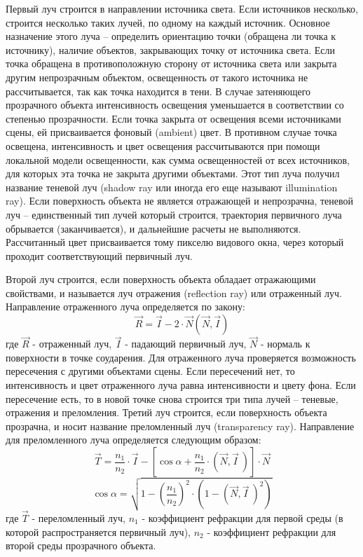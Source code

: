 \documentclass[12pt, a4paper, utf8]{article}
\begin{document}
Первый луч строится в направлении источника света. Если источников несколько, строится несколько таких лучей, по одному на каждый источник. Основное назначение этого луча – определить ориентацию точки (обращена ли точка к источнику), наличие объектов, закрывающих точку от источника света. Если точка обращена в противоположную сторону от источника света или закрыта другим непрозрачным объектом, освещенность от такого источника не рассчитывается, так как точка находится в тени. В случае затеняющего прозрачного объекта интенсивность освещения уменьшается в соответствии со степенью прозрачности. Если точка закрыта от освещения всеми источниками сцены, ей присваивается фоновый (ambient) цвет. В противном случае точка освещена, интенсивность и цвет освещения рассчитываются при помощи локальной модели освещенности, как сумма освещенностей от всех источников, для которых эта точка не закрыта другими объектами. Этот тип луча получил название теневой луч (shadow ray или иногда его еще называют illumination ray). Если поверхность объекта не является отражающей и непрозрачна, теневой луч – единственный тип лучей который строится, траектория первичного луча обрывается (заканчивается), и дальнейшие расчеты не выполняются. Рассчитанный цвет присваивается тому пикселю видового окна, через который проходит соответствующий первичный луч.\par
   Второй луч строится, если поверхность объекта обладает отражающими свойствами, и называется луч отражения (reflection ray) или отраженный луч. Направление отраженного луча определяется по закону:
\begin{equation}
\vec{R} = \vec{I} - 2 \cdot \vec{N} (\vec{N} , \vec{I})
\label{eq_reflect}
\end{equation}
где $\vec{R}$ - отраженный луч, $\vec{I}$ - падающий первичный луч, $\vec{N}$ - нормаль к поверхности в точке соударения.
Для отраженного луча проверяется возможность пересечения с другими объектами сцены. Если пересечений нет, то интенсивность и цвет отраженного луча равна интенсивности и цвету фона. Если пересечение есть, то в новой точке снова строится три типа лучей – теневые, отражения и преломления.
Третий луч строится, если поверхность объекта прозрачна, и носит название преломленный луч (transparency ray). Направление для преломленного луча определяется следующим образом:
$$
 \vec{T} = \frac{n_1}{n_2} \cdot \vec{I} - \left[ \cos \alpha + \frac{n_1}{n_2} \cdot \left(\vec{N},\vec{I} \ \right) \right] \cdot \vec{N}
$$
$$
\cos \alpha = \sqrt{1 - \left( \frac{n_1}{n_2} \right) ^2 \cdot \left(1-\left(\vec{N},\vec{I}\ \right)^2\right)}
$$
где $\vec{T}$ - переломленный луч, $n_1$ - коэффициент рефракции для первой среды (в которой распространяется первичный луч), $n_2$ - коэффициент рефракции для второй среды прозрачного объекта.
\end{document}

